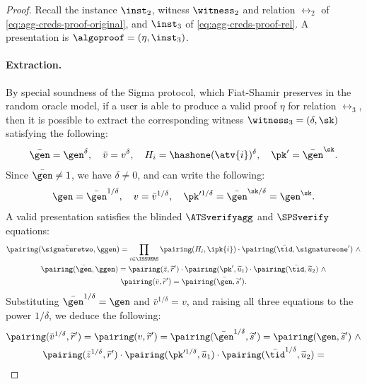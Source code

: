 \begin{proof}

    Recall the instance $\inst_2$, witness $\witness_2$ and relation $\rel_2$
of \eqref{eq:agg-creds-proof-original}, and $\inst_3$ of
\eqref{eq:agg-creds-proof-rel}. A presentation is $\algoproof = (\eta,
\inst_3)$.

  \paragraph{Extraction.} By special soundness of the Sigma protocol, which
Fiat-Shamir preserves in the random oracle model, if a user is able to produce
a valid proof $\eta$ for relation $\rel_3$, then it
is possible to extract the corresponding witness $\witness_3 = (\delta, \sk)$
satisfying the following:
%
  \begin{equation*}
%
    \bar{\gen} = \gen^\delta, \quad \bar{v} = v^\delta, \quad H_i =
\hashone(\atv{i})^\delta, \quad \pk' = \bar{\gen}^\sk.
%
  \end{equation*}
%
  Since $\bar{\gen} \neq 1$, we have $\delta \neq 0$, and can write the
following:
%
  \begin{equation*}
%
    \gen = \bar{\gen}^{1/\delta}, \quad v = \bar{v}^{1/\delta}, \quad
\pk'^{1/\delta} = \bar{\gen}^{\sk/\delta} = \gen^\sk.
%
  \end{equation*}
%
  A valid presentation satisfies the blinded
$\ATSverifyagg$ and $\SPSverify$ equations:
%
  \begin{gather*}
%
    \pairing(\bar{\signaturetwo}, \ggen) =
\prod_{i\in\ISSUERS}\pairing(H_i,\ipk{i}) \cdot
\pairing(\bar{\tid},\signatureone') \ \wedge \\ \pairing(\bar{\gen},\ggen) =
\pairing(\bar{z},\widetilde{r}')\cdot \pairing(\pk',\widetilde{u}_1) \cdot
\pairing(\bar{\tid},\widetilde{u}_2) \ \wedge \\
\pairing(\bar{v},\widetilde{r}') = \pairing(\bar{\gen},\widetilde{s}').
%
  \end{gather*}
%
  Substituting $\bar{\gen}^{1/\delta} = \gen$ and $\bar{v}^{1/\delta} = v$, and
raising all three equations to the power $1/\delta$, we deduce the following:
%
  \begin{gather*}
%
    \pairing(\bar{v}^{1/\delta}, \widetilde{r}') = \pairing(v, \widetilde{r}') =
\pairing(\bar{\gen}^{1/\delta}, \widetilde{s}') = \pairing(\gen, \widetilde{s}')
\ \wedge \\
    \pairing(\bar{z}^{1/\delta}, \widetilde{r}') \cdot \pairing( \pk'^{1/\delta},
\widetilde{u}_1) \cdot \pairing(\bar{\tid}^{1/\delta}, \widetilde{u}_2) =

\end{gather*}
\end{proof}
